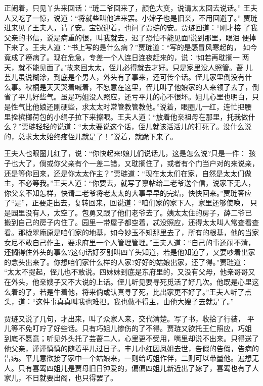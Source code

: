 正闹着，只见丫头来回话：“琏二爷回来了，颜色大变，说请太太回去说话。”
王夫人又吃了一惊，说道：“将就些叫他进来罢。小婶子也是旧亲，不用回避了。”
贾琏进来见了王夫人，请了安。宝钗迎着，也问了贾琏的安。贾琏回道：“刚才接
了我父亲的书信，说是病重的很，叫我就去，迟了恐怕不能见面!说到那里，眼泪
便掉下来了。王夫人道：“书上写的是什么病？”贾琏道：“写的是感冒风寒起的，
如今竟成了痨病了。现在危急，专差一个人连日连夜赶来的，说：‘如若再耽搁一
两天，就不能见面了。’故来回太太，侄儿必得就去才好。只是家里没人照管。蔷
儿芸儿虽说糊涂，到底是个男人，外头有了事来，还可传个话。侄儿家里倒没有什
么事。秋桐是天天哭着喊着，不愿意在这里，侄儿叫了他娘家的人来领了去了，倒
省了平儿好些气。虽是巧姐没人照应，还亏平儿的心不很坏。姐儿心里也明白，只
是性气比他娘还刚硬些，求太太时常管教管教他。”说着，眼圈儿一红，连忙把腰
里拴槟榔荷包的小绢子拉下来擦眼。王夫人道：“放着他亲祖母在那里，托我做什
么？”贾琏轻轻的说道：“太太要说这个话，侄儿就该活活儿的打死了。没什么说
的，总求太太始终疼侄儿就是了！”说着，就跪下来了。

王夫人也眼圈儿红了，说：“你快起来!娘儿们说话儿，这是怎么说?只是一件：
孩子也大了，倘或你父亲有个一差二错，又耽搁住了，或者有个门当户对的来说亲，
还是等你回来，还是你太太作主？”贾琏道：“现在太太们在家，自然是太太们做
主，不必等我。”王夫人道：“你要去，就写了禀帖给二老爷送个信，说家下无人，
你父亲不知怎样，快请二老爷将老太太的大事早早的完结，快快回来。”贾琏答应
了“是”，正要走出去，复转回来，回说道：“咱们家的家下人，家里还够使唤，
只是园里没有人，太空了。包勇又跟了他们老爷去了。姨太太住的房子，薛二爷已
搬到自己的房子内住了。园里一带屋子都空着，忒没照应，还得太太叫人常查看查
看。那栊翠庵原是咱们家的地基，如今妙玉不知那里去了，所有的根基，他的当家
女尼不敢自己作主，要求府里一个人管理管理。”王夫人道：“自己的事还闹不清，
还搁得住外头的事么?这句话好歹别叫四丫头知道，若是他知道了，又要吵着出家
的念头出来了。你想咱们家什么样的人家?好好的姑娘出家，还了得。”贾琏道：
“太太不提起，侄儿也不敢说。四妹妹到底是东府里的，又没有父母，他亲哥哥又
在外头，他亲嫂子又不大说的上话。侄儿听见要寻死觅活了好几次。他既是心里这
么着的了，若是牛着他，将来倘或认真寻了死，比出家更不好了。”王夫人听了点
头，道：“这件事真真叫我也难担。我也做不得主，由他大嫂子去就是了。”

贾琏又说了几句，才出来，叫了众家人来，交代清楚。写了书，收拾了行装，
平儿等不免叮咛了好些话。只有巧姐儿惨伤的了不得。贾琏又欲托王仁照应，巧姐
到底不愿意；听见外头托了芸蔷二人，心里更不受用，嘴里却说不出来。只得送了
他父亲，谨谨慎慎的随着平儿过日子。丰儿小红因凤姐去世，告假的告假，告病的
告病。平儿意欲接了家中一个姑娘来，一则给巧姐作伴，二则可以带量他。遍想无
人。只有喜鸾四姐儿是贾母旧日钟爱的，偏偏四姐儿新近出了嫁了，喜鸾也有了人
家儿，不日就要出阁，也只得罢了。

